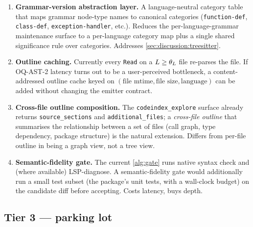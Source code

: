 \begin{enumerate}[leftmargin=*]
  \item \textbf{Grammar-version abstraction layer.} A
        language-neutral category table that maps grammar
        node-type names to canonical categories
        (\texttt{function-def}, \texttt{class-def},
        \texttt{exception-handler}, etc.). Reduces the
        per-language-grammar maintenance surface to a per-language
        category map plus a single shared significance rule over
        categories.
        Addresses \cref{sec:discussion:treesitter}.
  \item \textbf{Outline caching.} Currently every \texttt{Read}
        on a $L \geq \theta_{L}$ file re-parses the file. If
        OQ-AST-2 latency turns out to be a user-perceived
        bottleneck, a content-addressed outline cache keyed on
        $(\text{file mtime}, \text{file size}, \text{language})$
        can be added without changing the emitter contract.
  \item \textbf{Cross-file outline composition.} The
        \texttt{codeindex\_explore} surface already returns
        \texttt{source\_sections} and \texttt{additional\_files};
        a \emph{cross-file outline} that summarises the
        relationship between a set of files (call graph, type
        dependency, package structure) is the natural extension.
        Differs from per-file outline in being a graph view, not a
        tree view.
  \item \textbf{Semantic-fidelity gate.} The current
        \cref{alg:gate} runs native syntax check and (where
        available) LSP-diagnose. A semantic-fidelity gate would
        additionally run a small test subset (the package's unit
        tests, with a wall-clock budget) on the candidate diff
        before accepting. Costs latency, buys depth.
\end{enumerate}

\subsection{Tier 3 --- parking lot}
\label{sec:future:tier3}

